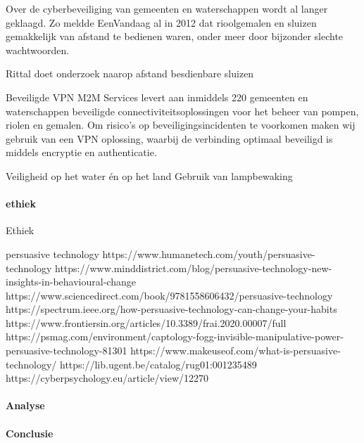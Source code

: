 \cite{cybersecWaterwerk}
Over de cyberbeveiliging van gemeenten en waterschappen wordt al langer geklaagd. Zo meldde EenVandaag al in 2012 dat rioolgemalen en sluizen gemakkelijk van afstand te bedienen waren, onder meer door bijzonder slechte wachtwoorden.

\cite{cybersecWaterschappen}
Rittal doet onderzoek naarop afstand besdienbare sluizen

\cite{cybersecZuidHolland}
Beveiligde VPN
M2M Services levert aan inmiddels 220 gemeenten en waterschappen beveiligde connectiviteitsoplossingen voor het beheer van pompen, riolen en gemalen. Om risico’s op beveiligingsincidenten te voorkomen maken wij gebruik van een VPN oplossing, waarbij de verbinding optimaal beveiligd is middels encryptie en authenticatie.

\cite{waterwerkNED}
Veiligheid op het water én op het land
Gebruik van lampbewaking 

\cite{veiligheidwaterland} 



\paragraph{ethiek}


Ethiek 



persuasive technology 
https://www.humanetech.com/youth/persuasive-technology 
\cite{humanTechpersuasiveTech}
https://www.minddistrict.com/blog/persuasive-technology-new-insights-in-behavioural-change 
https://www.sciencedirect.com/book/9781558606432/persuasive-technology 
https://spectrum.ieee.org/how-persuasive-technology-can-change-your-habits 
\cite{rezenfeld01012018persuasiveTecgHabits}
https://www.frontiersin.org/articles/10.3389/frai.2020.00007/full 
\cite{aldenaini28042020persuasiveTechTrends}
https://psmag.com/environment/captology-fogg-invisible-manipulative-power-persuasive-technology-81301 
\cite{larson14062017persuasivetechmanipulates}
https://www.makeuseof.com/what-is-persuasive-technology/ 
\cite{tanzem22012022persuasivetechchanginglives}
https://lib.ugent.be/catalog/rug01:001235489 
https://cyberpsychology.eu/article/view/12270 
\cite{tikkakuddonenpersuasiveTechnology}





\paragraph{Analyse}
\paragraph{Conclusie}

